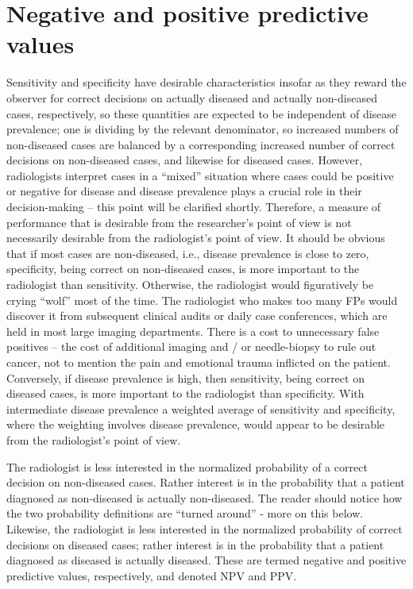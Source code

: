 \documentclass[
]{book}
\begin{document}
\hypertarget{negative-and-positive-predictive-values}{%
\section{Negative and positive predictive values}\label{negative-and-positive-predictive-values}}

Sensitivity and specificity have desirable characteristics insofar as they reward the observer for correct decisions on actually diseased and actually non-diseased cases, respectively, so these quantities are expected to be independent of disease prevalence; one is dividing by the relevant denominator, so increased numbers of non-diseased cases are balanced by a corresponding increased number of correct decisions on non-diseased cases, and likewise for diseased cases. However, radiologists interpret cases in a ``mixed'' situation where cases could be positive or negative for disease and disease prevalence plays a crucial role in their decision-making -- this point will be clarified shortly. Therefore, a measure of performance that is desirable from the researcher's point of view is not necessarily desirable from the radiologist's point of view. It should be obvious that if most cases are non-diseased, i.e., disease prevalence is close to zero, specificity, being correct on non-diseased cases, is more important to the radiologist than sensitivity. Otherwise, the radiologist would figuratively be crying ``wolf'' most of the time. The radiologist who makes too many FPs would discover it from subsequent clinical audits or daily case conferences, which are held in most large imaging departments. There is a cost to unnecessary false positives -- the cost of additional imaging and / or needle-biopsy to rule out cancer, not to mention the pain and emotional trauma inflicted on the patient. Conversely, if disease prevalence is high, then sensitivity, being correct on diseased cases, is more important to the radiologist than specificity. With intermediate disease prevalence a weighted average of sensitivity and specificity, where the weighting involves disease prevalence, would appear to be desirable from the radiologist's point of view.

The radiologist is less interested in the normalized probability of a correct decision on non-diseased cases. Rather interest is in the probability that a patient diagnosed as non-diseased is actually non-diseased. The reader should notice how the two probability definitions are ``turned around'' - more on this below. Likewise, the radiologist is less interested in the normalized probability of correct decisions on diseased cases; rather interest is in the probability that a patient diagnosed as diseased is actually diseased. These are termed negative and positive predictive values, respectively, and denoted NPV and PPV.
\end{document}
